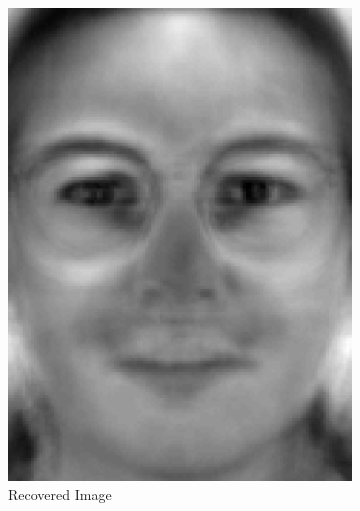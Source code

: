\documentclass[review]{elsarticle}
\begin{document}
\begin{figure}[H]
\begin{subfigure}[b]{0.18\textwidth}
	\includegraphics[width=\linewidth]{Fig_4b}
		\caption{Recovered Image}
	\label{fig:recov_image_ex_2} \hfill
\end{subfigure}
\begin{subfigure}[b]{0.18\textwidth} 
\centering

\end{subfigure}
\end{figure}
\end{document}
